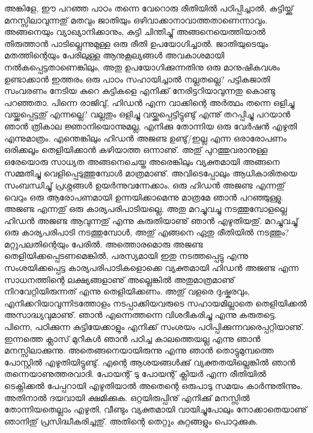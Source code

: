 \begin{enumerate}
അങ്കിളേ, ഈ പറഞ്ഞ പാഠം തന്നെ വേറൊരു രീതിയില്‍ പഠിപ്പിച്ചാല്‍, കുട്ടിയ്ക്കു് മനസ്സിലാവുന്നതു് മതവും ജാതിയും 
ഒഴിവാക്കാനാവാത്തതാണെന്നാവും. അങ്ങനെയും വ്യാഖ്യാനിക്കാനും, കുട്ടി ചിന്തിച്ചു് അങ്ങനെയെത്തിയാല്‍ തിരുത്താന്‍ 
പാടില്ലെന്നുമുള്ള ഒരു രീതി ഉപയോഗിച്ചാല്‍. ജാതിയുടെയും മതത്തിന്റെയും പേരിലുള്ള ആനുകൂല്യങ്ങള്‍ 
അവകാശമായി നല്‍കപ്പെട്ടതാണെങ്കിലും, അതു ഉപയോഗിക്കുന്നതിനു ഒരു മാനുഷികവശം ഉണ്ടാക്കാന്‍ ഇത്തരം 
ഒരു പാഠം സഹായിച്ചാല്‍ നല്ലതല്ലെ? പട്ടികജാതി സംവരണം നേടിയ കുറെ കുട്ടികളെ എനിക്ക് നേരിട്ടറിയാവുന്നതു കൊണ്ടു 
പറഞ്ഞതാ. പിന്നെ രാജിവു്, ഹിഡന്‍ എന്ന വാക്കിന്റെ അര്‍ത്ഥം തന്നെ ഒളിച്ചു വയ്ക്കപ്പെട്ടതു് എന്നല്ലെ? 
വല്ലതും ഒളിച്ചു വയ്ക്കപ്പെട്ടിട്ടുണ്ടു് എന്നു് തറപ്പിച്ചു പറയാന്‍ ഞാന്‍ ത്രികാല ജ്ഞാനിയൊന്നുമല്ല, എനിക്കു തോന്നിയ ഒരു വേര്‍ഷന്‍ 
എഴുതി എന്നുമാത്രം. എന്തെങ്കിലും ഹിഡന്‍ അജണ്ട ഉണ്ടു്/ഇല്ല എന്ന ഒരാരോപണം ഒരിക്കലൂം തെളിയിക്കാന്‍ 
കഴിയാത്ത ഒന്നാണു്. അതു് പുറത്തുവരാനുള്ള ഒരേയൊരു സാധ്യത അങ്ങനെചെയ്ത അരെങ്കിലും വ്യക്തമായി അങ്ങനെ 
സമ്മതിച്ചു വെളിപ്പെടുത്തുമ്പോള്‍ മാത്രമാണു്. അവിടെപ്പോലും ആധികാരിതയെ സംബന്ധിച്ചു് പ്രശ്നങ്ങള്‍ ഉയര്‍ന്നുവന്നേക്കാം. 
ഒരു ഹിഡന്‍ അജണ്ട എന്നതു് വെറും ഒരു ആരോപണമായി ഉന്നയിക്കാമെന്നു മാത്രമേ ഞാന്‍ പറഞ്ഞുള്ളു. അജണ്ട 
എന്നതു് ഒരു കാര്യപരിപാടിയല്ലെ, അതു മറച്ചുവച്ചു നടത്തുമ്പോളല്ലെ ഹിഡന്‍ അജണ്ട ആവുന്നതു് എന്നു കരുതിയാണു് 
ഞാന്‍ എഴുതിയതു്. മറച്ചുവച്ചു് ഒരു കാര്യപരിപാടി നടത്തുമ്പോള്‍, അതു് എങ്ങനെ ഏതു രീതിയില്‍ നടത്തും? 
മറ്റുപലതിന്റെയും പേരില്‍. അത്തൊരമൊരു അജണ്ട തെളിയിക്കപ്പെടണമെങ്കില്‍, പരസ്യമായി ഇതു നടത്തപ്പെട്ടു 
എന്നു സംശയിക്കപ്പെട്ട കാര്യപരിപാടികളൊക്കെ വ്യക്തമായി ഹിഡന്‍ അജണ്ട എന്ന സാധനത്തിന്റെ ലക്ഷ്യങ്ങളാണു് 
അല്ലെങ്കില്‍ അതുമാത്രമാണു് നിറവേറ്റിയിരുന്നത് എന്നു തെളിയിക്കണം. അതു് വളരെ ദുഷ്കരവും, എനിക്കറിയാവുന്നിടത്തോളം 
നടപ്പാക്കിയവരുടെ സഹായമില്ലാതെ തെളിയിക്കല്‍ അസാദ്ധ്യവുമാണു്. ഞാന്‍ എന്നെത്തന്നെ വിശദീകരിച്ചു എന്നു 
കരുതട്ടെ. പിന്നെ, പഠിക്കുന്ന കുട്ടിയേക്കാളും എനിക്ക് സംശയം പഠിപ്പിക്കുന്നവരെപ്പറ്റിയാണു്. ഇന്നത്തെ ക്ലാസ് മുറികള്‍ 
ഞാന്‍ പഠിച്ച കാലത്തെയല്ല എന്നു ഞാന്‍ മനസ്സിലാക്കുന്നു. അതെങ്ങനെയായിരുന്നു എന്നു ഞാന്‍ തൊട്ടുമുമ്പത്തെ 
പോസ്റ്റില്‍ എഴുതിയിട്ടുണ്ടു്. എന്റെ ആശയങ്ങള്‍ക്കു് വ്യക്തതയില്ലെങ്കില്‍ ഞാന്‍ തന്നെയാണുത്തരവാദി. 
പോയന്റ് ടു പോയന്റ് ക്ലിയര്‍ എന്ന രീതിയില്‍ ടെക്നിക്കല്‍ പേപ്പറായി എഴുതിയാല്‍ അതെന്റെ ഒരുപാടു സമയം 
കാര്‍ന്നുതിന്നും. അതിനാല്‍ ദയവായി ക്ഷമിക്കുക. ഒറ്റയിരുപ്പിനു് എനിക്കു് മനസ്സില്‍ തോന്നിയതെല്ലാം എഴുതി, വീണ്ടും 
വ്യക്തമായി വായിച്ചുപോലും നോക്കാതെയാണു് ഞാനിതു് പ്രസിദ്ധീകരിച്ചതു്. അതിന്റെ തെറ്റും കുറ്റങ്ങളും പൊറുക്കുക.

\end{enumerate}

\newpage
